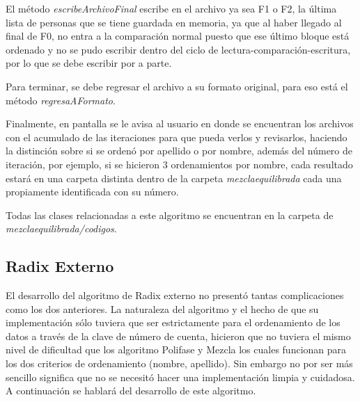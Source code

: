 \documentclass[letter]{report}
\begin{document}
El método \textit{escribeArchivoFinal} escribe en el archivo ya sea F1 o F2, la última lista de personas que se tiene guardada en memoria, ya que al haber llegado al final de F0, no entra a la comparación normal puesto que ese último bloque está ordenado y no se pudo escribir dentro del ciclo de lectura-comparación-escritura, por lo que se debe escribir por a parte.\medskip

Para terminar, se debe regresar el archivo a su formato original, para eso está el método \textit{regresaAFormato}.

Finalmente, en pantalla se le avisa al usuario en donde se encuentran los archivos con el acumulado de las iteraciones para que pueda verlos y revisarlos, haciendo la distinción sobre si se ordenó por apellido o por nombre, además del número de iteración, por ejemplo, si se hicieron 3 ordenamientos por nombre, cada resultado estará en una carpeta distinta dentro de la carpeta \textit{mezclaequilibrada} cada una propiamente identificada con su número.\medskip

Todas las clases relacionadas a este algoritmo se encuentran en la carpeta de \textit{mezclaequilibrada/codigos}.\medskip

\clearpage
{}
\subsection*{Radix Externo}
\noindent El desarrollo del algoritmo de Radix externo no presentó tantas complicaciones como los dos anteriores. La naturaleza del algoritmo y el hecho de que su implementación sólo tuviera que ser estrictamente para el ordenamiento de los datos a través de la clave de número de cuenta, hicieron que no tuviera el mismo nivel de dificultad que los algoritmo Polifase y Mezcla los cuales funcionan para los dos criterios de ordenamiento (nombre, apellido). Sin embargo no por ser más sencillo significa que no se necesitó hacer una implementación limpia y cuidadosa. A continuación se hablará del desarrollo de este algoritmo.\medskip
\end{document}
